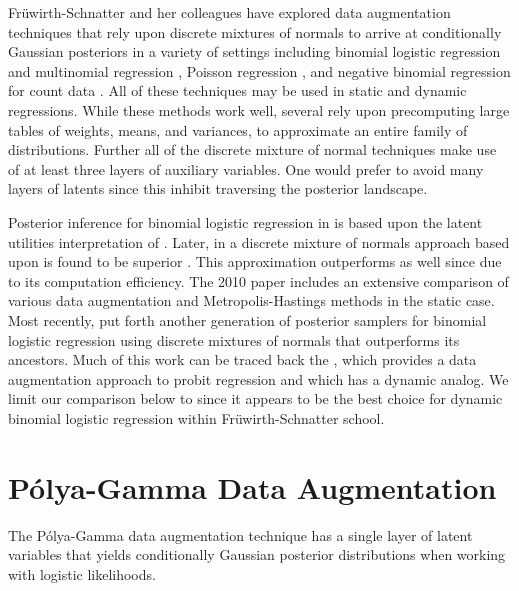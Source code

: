 \documentclass[11pt]{article}
\newcommand{\Polya}{P\'{o}lya}
\begin{document}
Fr\"{u}wirth-Schnatter and her colleagues have explored data augmentation
techniques that rely upon discrete mixtures of normals to arrive at
conditionally Gaussian posteriors in a variety of settings including binomial
logistic regression and multinomial regression
\citep{fruhwirth-schnatter-fruhwirth-2007, fruhwirth-schnatter-fruhwirth-2010,
  fussl-etal-2013}, Poisson regression \citep{fruhwirth-schnatter-wagner-2006,
  fruhwirth-schnatter-etal-2009}, and negative binomial regression for count
data \citep{fruhwirth-schnatter-etal-2009}.  All of these techniques may be used
in static and dynamic regressions.  While these methods work well, several rely
upon precomputing large tables of weights, means, and variances, to approximate
an entire family of distributions.  Further all of the discrete mixture of
normal techniques make use of at least three layers of auxiliary variables.  One
would prefer to avoid many layers of latents since this inhibit traversing the
posterior landscape.

Posterior inference for binomial logistic regression in
\cite{fruhwirth-schnatter-fruhwirth-2007} is based upon the latent utilities
interpretation of \cite{mcfadden-1974}.  Later, in a discrete mixture of normals
approach based upon \cite{holmes-held-2006} is found to be superior
\citep{fruhwirth-schnatter-fruhwirth-2010}.  This approximation outperforms
\cite{holmes-held-2006} as well since due to its computation efficiency.  The
2010 paper includes an extensive comparison of various data augmentation and
Metropolis-Hastings methods in the static case.  Most recently,
\cite{fussl-etal-2013} put forth another generation of posterior samplers for
binomial logistic regression using discrete mixtures of normals that outperforms
its ancestors.  Much of this work can be traced back the
\cite{albert-chib-1993}, which provides a data augmentation approach to probit
regression and which has a dynamic analog.  We limit our comparison below to
\cite{fussl-etal-2013} since it appears to be the best choice for dynamic
binomial logistic regression within Fr\"{u}wirth-Schnatter school.

\section{\Polya-Gamma Data Augmentation}

The \Polya-Gamma data augmentation technique has a single layer of latent
variables that yields conditionally Gaussian posterior distributions when
working with logistic likelihoods.
\end{document}
